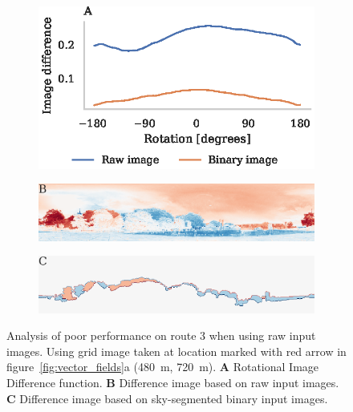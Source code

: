 \documentclass[letterpaper]{article}
\begin{document}
\begin{figure}[t]
    \begin{subfigure}[b]{\columnwidth}
        \includegraphics[width=\columnwidth]{figures/route3_ridf.eps}
    \end{subfigure}
    \begin{subfigure}[b]{\columnwidth}
        \includegraphics[width=\columnwidth]{figures/route3_unwrapped_image_diff.png}
    \end{subfigure}
    \begin{subfigure}[b]{\columnwidth}
        \includegraphics[width=\columnwidth]{figures/route3_mask_image_diff.png}
    \end{subfigure}
    \caption{Analysis of poor performance on route 3 when using raw input images.
    Using grid image taken at location marked with red arrow in figure~\ref{fig:vector_fields}a (\SI{480}{\metre}, \SI{720}{\metre}).
    \textbf{A} Rotational Image Difference function.
    \textbf{B} Difference image based on raw input images.
    \textbf{C} Difference image based on sky-segmented binary input images.}
    \label{fig:light_level}
\end{figure}
\end{document}
